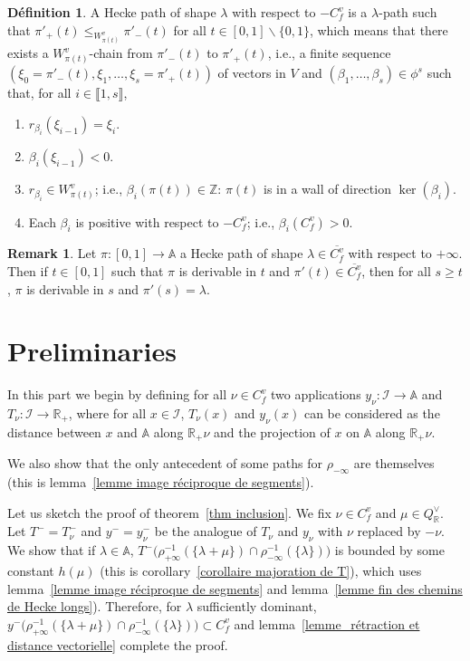 \documentclass[12pt]{article}
\theoremstyle{plain}
\theoremstyle{definition}
\newtheorem{defn}[thm]{Définition}
\newtheorem{rque}[thm]{Remark}
\newcommand{\R}{\mathbb{R}}
\newcommand{\A}{\mathbb{A}}
\newcommand{\Z}{\mathbb{Z}}
\newcommand{\I}{\mathcal{I}}
\begin{document}
\begin{defn}
A Hecke path of shape $\lambda$ with respect to $-C_f^v$ is a $\lambda$-path such that
 $\pi'_+(t)\leq_{W^v_{\pi (t)}} \pi'_-(t)$ for all $t\in [0,1]\backslash \{0,1\}$, which 
 means that there exists a $W_{\pi(t)}^v$-chain from $\pi'_-(t)$ to $\pi'_{+}(t)$, i.e., a 
 finite sequence $(\xi_0=\pi'_-(t),\xi_1,\ldots, \xi_s=\pi'_+(t))$ of vectors in $V$ and
  $(\beta_1,\ldots,\beta_s)\in \phi^s$ such that, for all $i\in \llbracket 1,s\rrbracket$,
\begin{enumerate}
\item $r_{\beta_i}(\xi_{i-1})=\xi_i.$

\item $\beta_i(\xi_{i-1})<0.$

\item $r_{\beta_i}\in W^v_{\pi(t)}$; i.e., $\beta_i(\pi(t))\in \Z$: $\pi(t)$ is in a wall of direction $\ker(\beta_i)$.

\item Each $\beta_i$ is positive with respect to $-C_f^v$; i.e., $\beta_i(C_f^v)>0$.
\end{enumerate}
\end{defn}

\begin{rque}\label{rque chemins de Hecke}
Let $\pi:[0,1]\rightarrow \A$ a Hecke path of shape $\lambda\in \overline{C_f^v}$ with respect to $+\infty$. Then if $t\in [0,1]$ such that $\pi$ is derivable in $t$ and $\pi'(t)\in \overline{C_f^v}$, then for all $s\geq t$, $\pi$ is derivable in $s$ and $\pi'(s)=\lambda$.
\end{rque}

\section{Preliminaries}\label{sect preliminaries}

In this part we begin by defining for all $\nu\in C_f^v$ two applications $y_\nu:\I\rightarrow \A$ and $T_\nu:\I\rightarrow \R_+$, where for all $x\in \I$, $T_\nu(x)$ and $y_\nu(x)$ can be considered as the distance between $x$ and $\A$ along $\R_+\nu$ and the projection of $x$ on $\A$ along $\R_+\nu$. 

We also show that the only antecedent of some paths for $\rho_{-\infty}$ are themselves (this is lemma~\ref{lemme image réciproque de segments}).

\vspace{3mm}

Let us sketch the proof of theorem~\ref{thm inclusion}. We fix $\nu\in C_f^v$ and $\mu\in Q^\vee_\R$. Let $T^-=T_{\nu}^-$ and $y^-=y_\nu^-$ be the analogue of $T_\nu$ and $y_\nu$ with $\nu$ replaced by $-\nu$. We show that if $\lambda\in \A$, $T^-\big(\rho_{+\infty}^{-1}(\{\lambda+\mu\})\cap \rho_{-\infty}^{-1}(\{\lambda\})\big)$ is bounded by some constant $h(\mu)$ (this is corollary~\ref{corollaire majoration de T}), which uses lemma~\ref{lemme image réciproque de segments} and lemma~\ref{lemme fin des chemins de Hecke longs}). Therefore, for $\lambda$ sufficiently dominant, $y^-\big(\rho_{+\infty}^{-1}(\{\lambda+\mu\})\cap \rho_{-\infty}^{-1}(\{\lambda\})\big)\subset C_f^v$ and lemma~\ref{lemme_rétraction et distance vectorielle} complete the proof.
\end{document}
